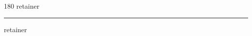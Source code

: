 
\begin{frame}
\begin{center}
\begin{turn}{180}
{\fontsize{2.5cm}{1em}\selectfont retainer}
\end{turn}
\vspace{1em}\par  
\hrule
\vspace{1em}\par  
{\fontsize{2.5cm}{1em}\selectfont retainer}
\end{center}
\end{frame}
